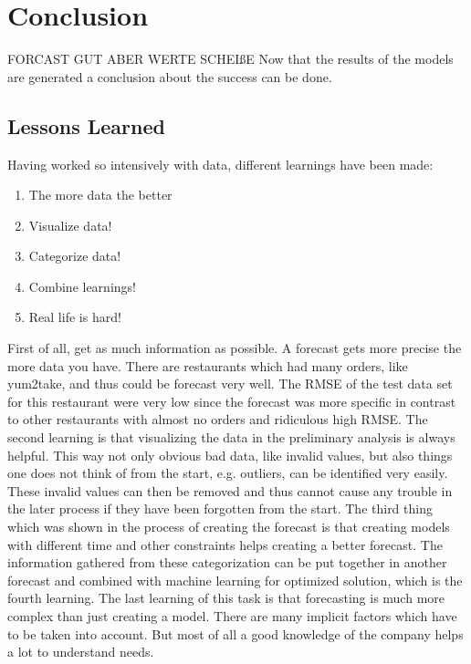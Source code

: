 \chapter{Conclusion}\label{chapter:Conclusion}

FORCAST GUT ABER WERTE SCHEIßE
Now that the results of the models are generated a conclusion about the success can be done.
\section{Lessons Learned}
Having worked so intensively with data, different learnings have been made:

\begin{enumerate}
\item The more data the better
\item Visualize data!
\item Categorize data!
\item Combine learnings!
\item Real life is hard!
\end{enumerate}

First of all, get as much information as possible. A forecast gets more precise the more data you have. There are restaurants which had many orders, like yum2take, and thus could be forecast very well. The RMSE of the test data set for this restaurant were very low since the forecast was more specific in contrast to other restaurants with almost no orders and ridiculous high RMSE.\newline
The second learning is that visualizing the data in the preliminary analysis is always helpful. This way not only obvious bad data, like invalid values, but also things one does not think of from the start, e.g. outliers, can be identified very easily. These invalid values can then be removed and thus cannot cause any trouble in the later process if they have been forgotten from the start.\newline
The third thing which was shown in the process of creating the forecast is that creating models with different time and other constraints helps creating a better forecast. The information gathered from these categorization can be put together in another forecast and combined with machine learning for optimized solution, which is the fourth learning.\newline
The last learning of this task is that forecasting is much more complex than just creating a model. There are many implicit factors which have to be taken into account. But most of all a good knowledge of the company helps a lot to understand needs.

